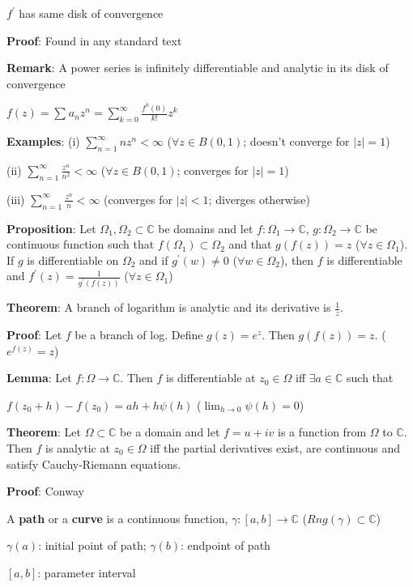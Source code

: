 \documentclass{article}
\begin{document}
\begin{flushleft}
$f^{'}$ has same disk of convergence

\textbf{Proof}: Found in any standard text

\textbf{Remark}: A power series is infinitely differentiable and analytic in its disk of convergence

$f(z)=\sum_{}^{}a_nz^n =\sum_{k=0}^{\infty} \frac{f^{k}(0)}{k!} z^k$

\textbf{Examples}: (i) $\sum_{n=1}^{\infty} nz^n <\infty$ ($\forall z \in B(0,1)$; doesn't converge for $|z|=1$) 

(ii) $\sum_{n=1}^{\infty} \frac{z^n}{n^2} <\infty$ ($\forall z\in B(0,1)$; converges for $|z|=1$)

(iii) $\sum_{n=1}^{\infty} \frac{z^n}{n} <\infty$ (converges for $|z|<1$; diverges otherwise)

\textbf{Proposition}: Let $\Omega_1,\Omega_2 \subset \mathds{C}$ be domains and let $f:\Omega_1\rightarrow \mathds{C}$,
$g:\Omega_2\rightarrow \mathds{C}$ be continuous function such that $f(\Omega_1)\subset \Omega_2$ and that $g(f(z))=z$ ($\forall z\in \Omega_1$).
If $g$ is differentiable on $\Omega_2$ and if $g^{'}(w)\neq 0$ ($\forall w \in \Omega_2$), then $f$ is differentiable and $f^{'}(z)=\frac{1}{g^{'}(f(z))}$ ($\forall z\in \Omega_1$)

\textbf{Theorem}: A branch of logarithm is analytic and its derivative is $\frac{1}{z}$.

\textbf{Proof}: Let $f$ be a branch of log. Define $g(z)=e^z$. Then $g(f(z))=z$. ($e^{f(z)}=z$)

\textbf{Lemma}: Let $f:\Omega \rightarrow \mathds{C}$. Then $f$ is differentiable at $z_0\in \Omega$ iff $\exists a\in \mathds{C}$ such that 

$f(z_0+h)-f(z_0)= ah+h\psi(h)$ ($\lim_{h \to 0} \psi(h)=0$)

\textbf{Theorem}: Let $\Omega \subset \mathds{C}$ be a domain and let $f=u+iv$ is a function from $\Omega$ to $\mathds{C}$.
Then $f$ is analytic at $z_0\in \Omega$ iff the partial derivatives exist, are continuous and satisfy Cauchy-Riemann equations.

\textbf{Proof}: Conway

\clearpage

A \textbf{path} or a \textbf{curve} is a continuous function, $\gamma:[a,b]\rightarrow \mathds{C}$ 
($Rng(\gamma)\subset \mathds{C}$) 

$\gamma(a)$: initial point of path; $\gamma(b)$: endpoint of path

$[a,b]$: parameter interval 


\end{flushleft}
\end{document}
